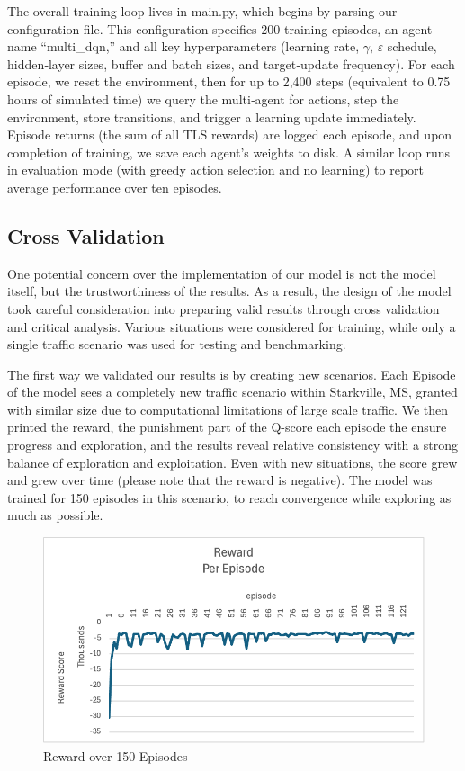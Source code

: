 \documentclass[conference]{IEEEtran}
\begin{document}
The overall training loop lives in main.py, which begins by parsing our configuration file. This configuration specifies 200 training episodes, an agent name ``multi\_dqn,'' and all key hyperparameters (learning rate, $\gamma$, $\varepsilon$ schedule, hidden‐layer sizes, buffer and batch sizes, and target‐update frequency). For each episode, we reset the environment, then for up to 2,400 steps (equivalent to 0.75 hours of simulated time) we query the multi‐agent for actions, step the environment, store transitions, and trigger a learning update immediately. Episode returns (the sum of all TLS rewards) are logged each episode, and upon completion of training, we save each agent’s weights to disk. A similar loop runs in evaluation mode (with greedy action selection and no learning) to report average performance over ten episodes.

\subsection{Cross Validation}

One potential concern over the implementation of our model is not the model itself, but the trustworthiness of the results. As a result, the design of the model took careful consideration into preparing valid results through cross validation and critical analysis. Various situations were considered for training, while only a single traffic scenario was used for testing and benchmarking. 

The first way we validated our results is by creating new scenarios. Each Episode of the model sees a completely new traffic scenario within Starkville, MS, granted with similar size due to computational limitations of large scale traffic. We then printed the reward, the punishment part of the Q-score each episode the ensure progress and exploration, and the results reveal relative consistency with a strong balance of exploration and exploitation. Even with new situations, the score grew and grew over time (please note that the reward is negative). The model was trained for 150 episodes in this scenario, to reach convergence while exploring as much as possible. 

\begin{figure}
    \centering
    \includegraphics[width=0.9\linewidth]{Reward.png}
    \caption{Reward over 150 Episodes}
\end{figure}
\end{document}
